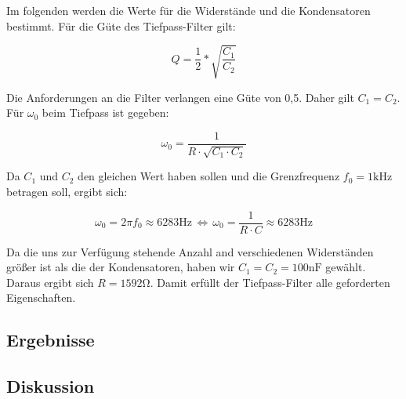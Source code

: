 Im folgenden werden die Werte für die Widerstände und die Kondensatoren bestimmt.
Für die Güte des Tiefpass-Filter gilt:

$$ Q = \frac{1}{2}*\sqrt{\frac{C_{1}}{C_{2}}} $$

Die Anforderungen an die Filter verlangen eine Güte von 0,5. Daher gilt $C_{1}=C_{2}$.\\
Für $\omega_{0}$ beim Tiefpass ist gegeben:

$$\omega_{0}=\frac{1}{R\cdot\sqrt{C_{1} \cdot C_{2}}}$$

Da $C_{1}$ und $C_{2}$ den gleichen Wert haben sollen und die Grenzfrequenz $f_{0}=1\si{\kilo\hertz}$ betragen soll, ergibt sich:

$$\omega_{0}=2\pi f_{0} \approx 6283\si{\hertz} \, \Leftrightarrow \,\omega_{0}=\frac{1}{R\cdot C}\approx 6283\si{\hertz} $$

Da die uns zur Verfügung stehende Anzahl and verschiedenen Widerständen größer ist als die der Kondensatoren, haben wir $C_{1}=C_{2}=100\si{\nano\farad}$ gewählt.
Daraus ergibt sich $R=1592\si{\ohm}$. Damit erfüllt der Tiefpass-Filter alle geforderten Eigenschaften.



\subsection{Ergebnisse}

\subsection{Diskussion}


